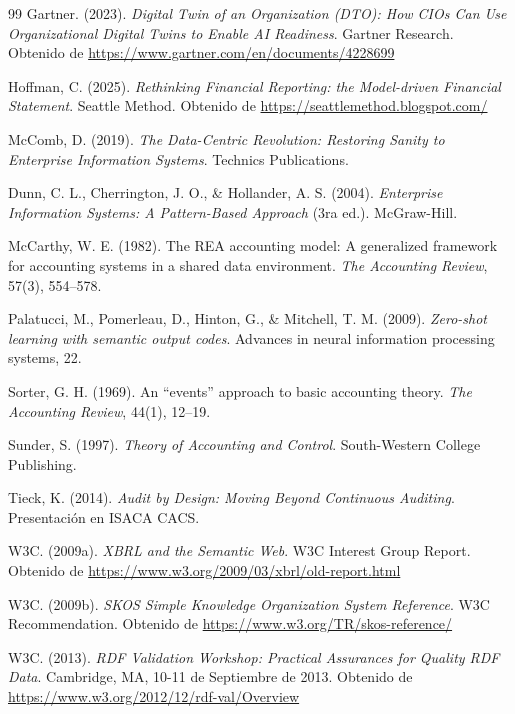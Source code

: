 \documentclass[12pt, a4paper]{article}
\begin{document}
\begin{thebibliography}{99}
Gartner. (2023). \textit{Digital Twin of an Organization (DTO): How CIOs Can Use Organizational Digital Twins to Enable AI Readiness}. Gartner Research. Obtenido de \url{https://www.gartner.com/en/documents/4228699}

Hoffman, C. (2025). \textit{Rethinking Financial Reporting: the Model-driven Financial Statement}. Seattle Method. Obtenido de \url{https://seattlemethod.blogspot.com/}

McComb, D. (2019). \textit{The Data-Centric Revolution: Restoring Sanity to Enterprise Information Systems}. Technics Publications.

Dunn, C. L., Cherrington, J. O., \& Hollander, A. S. (2004). \textit{Enterprise Information Systems: A Pattern-Based Approach} (3ra ed.). McGraw-Hill.

McCarthy, W. E. (1982). The REA accounting model: A generalized framework for accounting systems in a shared data environment. \textit{The Accounting Review}, 57(3), 554--578.

Palatucci, M., Pomerleau, D., Hinton, G., \& Mitchell, T. M. (2009). \textit{Zero-shot learning with semantic output codes}. Advances in neural information processing systems, 22.

Sorter, G. H. (1969). An ``events'' approach to basic accounting theory. \textit{The Accounting Review}, 44(1), 12--19.

Sunder, S. (1997). \textit{Theory of Accounting and Control}. South-Western College Publishing.

Tieck, K. (2014). \textit{Audit by Design: Moving Beyond Continuous Auditing}. Presentación en ISACA CACS.

W3C. (2009a). \textit{XBRL and the Semantic Web}. W3C Interest Group Report. Obtenido de \url{https://www.w3.org/2009/03/xbrl/old-report.html}

W3C. (2009b). \textit{SKOS Simple Knowledge Organization System Reference}. W3C Recommendation. Obtenido de \url{https://www.w3.org/TR/skos-reference/}

W3C. (2013). \textit{RDF Validation Workshop: Practical Assurances for Quality RDF Data}. Cambridge, MA, 10-11 de Septiembre de 2013. Obtenido de \url{https://www.w3.org/2012/12/rdf-val/Overview}

\end{thebibliography}
\end{document}

